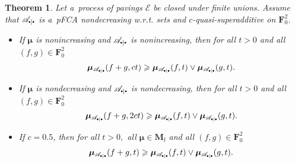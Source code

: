 \documentclass[preprint,11pt]{elsarticle}
\newtheorem{tw}{Theorem}[section]
\theoremstyle{definition}
\newcommand\bF{\mathbf{F}} %
\newcommand\bFs{\bF_0^2} %
\newcommand\bMf{\mathbf{M}_{\mathrm{f}}}%
\newcommand\sbullet[1][.5]{\mathbin{\vcenter{\hbox{\scalebox{#1}{$\bullet$}}}}}
\newcommand\bpeA{\mathscr {A}_{\sbullet|\sbullet}}%
\newcommand\bE{{\mathscr {E}}}
\newcommand{\bmu}{\boldsymbol{\mu}}
\newcommand\bmub[1][\bpeA]{\bmu_{#1}}
\renewcommand\ge{\geqslant}
\begin{document}
\begin{tw}\label{tw:3.17}
Let a~process of pavings $\bE$ be closed under finite unions. Assume that $\bpeA$ is a~pFCA nondecreasing w.r.t. sets and $c$-quasi-superadditive on $\bFs$.
 \begin{itemize}[noitemsep]
     \item[(a)] If $\bmu$ is nonincreasing and $\bpeA$ is nonincreasing, then for all $t>0$ and all $(f,g)\in\bFs$
    \begin{align*}
         \bmub(f+g,c t)\ge \bmub(f,t)\vee\bmub(g,t).
    \end{align*}

     \item[(b)]  If $\bmu$ is nondecreasing and $\bpeA$ is nondecreasing, then for all $t>0$ and all $(f,g)\in \bFs$
    \begin{align*}
         \bmub(f+g,2c t)\ge \bmub(f,t)\vee\bmub(g,t).
    \end{align*}

      \item[(c)] If  %
      $c=0{.}5$, then for all  $t>0,$ all $\bmu\in\bMf$ and all $(f,g)\in\bFs$
    \begin{align*}
        \bmub(f+g,t)\ge \bmub(f,t)\vee\bmub(g,t).
    \end{align*}
\end{itemize}
\end{tw}
\end{document}
